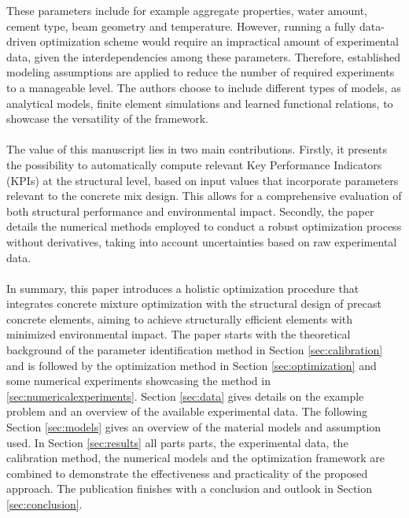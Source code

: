 These parameters include for example aggregate properties, water amount, cement type, beam geometry and temperature. 
However, running a fully data-driven optimization scheme would require an impractical amount of experimental data, given the interdependencies among these parameters. 
Therefore, established modeling assumptions are applied to reduce the number of required experiments to a manageable level.
The authors choose to include different types of models, as analytical models, finite element simulations and learned functional relations, to showcase the versatility of the framework.
\\\\
%
The value of this manuscript lies in two main contributions. 
Firstly, it presents the possibility to automatically compute relevant Key Performance Indicators (KPIs) at the structural level, based on input values that incorporate parameters relevant to the concrete mix design. 
This allows for a comprehensive evaluation of both structural performance and environmental impact. 
Secondly, the paper details the numerical methods employed to conduct a robust optimization process without derivatives, taking into account uncertainties based on raw experimental data.\\\\
In summary, this paper introduces a holistic optimization procedure that integrates concrete mixture optimization with the structural design of precast concrete elements, aiming to achieve structurally efficient elements with minimized environmental impact. 
The paper starts  with the theoretical background of the parameter identification method in Section \ref{sec:calibration} and is followed by the optimization method in Section \ref{sec:optimization} and some numerical experiments showcasing the method in \ref{sec:numericalexperiments}.
Section \ref{sec:data} gives details on the example problem and an overview of the available experimental data.
The following Section \ref{sec:models} gives an overview of the material models and assumption used. 
In Section \ref{sec:results} all parts parts, the experimental data, the calibration method, the numerical models and the optimization framework are combined to demonstrate the effectiveness and practicality of the proposed approach.
The publication finishes with a conclusion and outlook in Section \ref{sec:conclusion}.
\\\\
